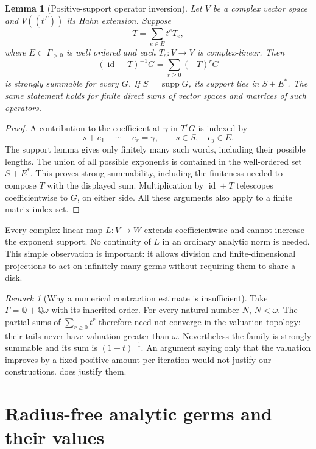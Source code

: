 \documentclass[11pt,letterpaper]{article}
\newtheorem{lemma}[lemma]{Lemma}
\theoremstyle{definition}
\theoremstyle{remark}
\newtheorem{remark}[remark]{Remark}
\newcommand{\Q}{\mathbb Q}
\newcommand{\supp}{\operatorname{supp}}
\newcommand{\id}{\operatorname{id}}
\numberwithin{equation}{section}
\begin{document}
\begin{lemma}[Positive-support operator inversion]\label{lem:operator}
Let $V$ be a complex vector space and $V((t^\Gamma))$ its Hahn extension. Suppose
\[
 T=\sum_{e\in E}t^eT_e,
\]
where $E\subset\Gamma_{>0}$ is well ordered and each $T_e:V\to V$ is complex-linear. Then
\begin{equation}\label{eq:operator-inverse}
 (\id+T)^{-1}G=\sum_{r\ge0}(-T)^rG
\end{equation}
is strongly summable for every $G$. If $S=\supp G$, its support lies in $S+E^*$. The same statement holds for finite direct sums of vector spaces and matrices of such operators.
\end{lemma}
\begin{proof}
A contribution to the coefficient at $\gamma$ in $T^rG$ is indexed by
\[
 s+e_1+\cdots+e_r=\gamma,
 \qquad s\in S,\quad e_j\in E.
\]
The support lemma gives only finitely many such words, including their possible lengths. The union of all possible exponents is contained in the well-ordered set $S+E^*$. This proves strong summability, including the finiteness needed to compose $T$ with the displayed sum. Multiplication by $\id+T$ telescopes coefficientwise to $G$, on either side. All these arguments also apply to a finite matrix index set.
\end{proof}

Every complex-linear map $L:V\to W$ extends coefficientwise and cannot increase the exponent support. No continuity of $L$ in an ordinary analytic norm is needed. This simple observation is important: it allows division and finite-dimensional projections to act on infinitely many germs without requiring them to share a disk.

\begin{remark}[Why a numerical contraction estimate is insufficient]\label{rem:rank}
Take $\Gamma=\Q+\Q\omega$ with its inherited order. For every natural number $N$, $N<\omega$. The partial sums of $\sum_{r\ge0}t^r$ therefore need not converge in the valuation topology: their tails never have valuation greater than $\omega$. Nevertheless the family is strongly summable and its sum is $(1-t)^{-1}$. An argument saying only that the valuation improves by a fixed positive amount per iteration would not justify our constructions.  does justify them.
\end{remark}

\section{Radius-free analytic germs and their values}\label{sec:germs}
\end{document}
